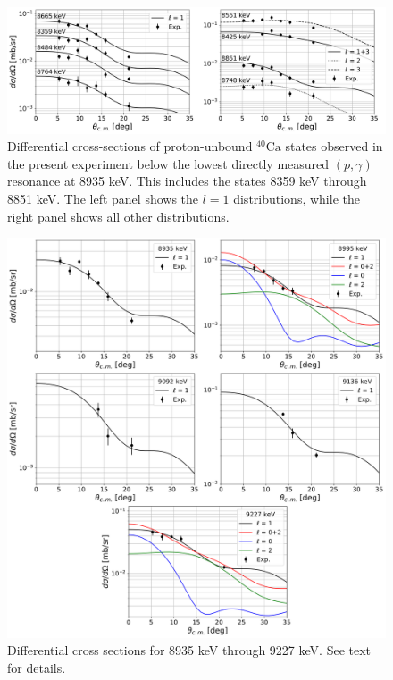 \begin{figure}[t]
\centering
\includegraphics[width=6.5in]{Chapter-6/figs/unbound.png}
\caption{\label{fig:unbound_l}Differential cross-sections of proton-unbound $^{40}\mathrm{Ca}$ states observed in the present experiment below the lowest directly measured $(p,\gamma)$ resonance at 8935 keV. This includes the states 8359 keV through 8851 keV. The left panel shows the $l=1$ distributions, while the right panel shows all other distributions.}
\end{figure}

\begin{figure}[!p]
\centering
\includegraphics[width=6.5in]{Chapter-6/figs/diffcross_6panel_4.png}
\caption{\label{fig:diffcross_6panel_4}Differential cross sections for 8935 keV through 9227 keV. See text for details.}
\end{figure}

